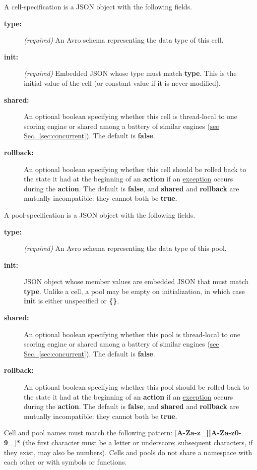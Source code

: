 \documentclass{article}
\newcommand{\PFAc}{\ttfamily\bfseries}
\newenvironment{allowedfields}%
  {\begin{center} \begin{minipage}{0.9\linewidth} \begin{description}}%
  {\end{description} \end{minipage} \end{center}}
\theoremstyle{definition}
\begin{document}
A cell-specification is a JSON object with the following fields.
\begin{allowedfields}
\item[\PFAc type:] {\it (required)} An Avro schema representing the data type of this cell.
\item[\PFAc init:] {\it (required)} Embedded JSON whose type must match {\PFAc type}.  This is the initial value of the cell (or constant value if it is never modified).
\item[\PFAc shared:] An optional boolean specifying whether this cell is thread-local to one scoring engine or shared among a battery of similar engines (\hyperlink{hsec:concurrent}{see Sec.~\ref{sec:concurrent}}).  The default is {\PFAc false}.
\item[\PFAc rollback:] An optional boolean specifying whether this cell should be rolled back to the state it had at the beginning of an {\PFAc action} if an \hyperlink{hsec:exceptions}{exception} occurs during the {\PFAc action}.  The default is {\PFAc false}, and {\PFAc shared} and {\PFAc rollback} are mutually incompatible: they cannot both be {\PFAc true}.
\end{allowedfields}

A pool-specification is a JSON object with the following fields.
\begin{allowedfields}
\item[\PFAc type:] {\it (required)} An Avro schema representing the data type of this pool.
\item[\PFAc init:] JSON object whose member values are embedded JSON that must match {\PFAc type}.  Unlike a cell, a pool may be empty on initialization, in which case {\PFAc init} is either unspecified or {\PFAc \{\}}.
\item[\PFAc shared:] An optional boolean specifying whether this pool is thread-local to one scoring engine or shared among a battery of similar engines (\hyperlink{hsec:concurrent}{see Sec.~\ref{sec:concurrent}}).  The default is {\PFAc false}.
\item[\PFAc rollback:] An optional boolean specifying whether this pool should be rolled back to the state it had at the beginning of an {\PFAc action} if an \hyperlink{hsec:exceptions}{exception} occurs during the {\PFAc action}.  The default is {\PFAc false}, and {\PFAc shared} and {\PFAc rollback} are mutually incompatible: they cannot both be {\PFAc true}.
\end{allowedfields}

Cell and pool names must match the following pattern: {\PFAc [A-Za-z\_][A-Za-z0-9\_]*} (the first character must be a letter or underscore; subsequent characters, if they exist, may also be numbers).  Cells and pools do not share a namespace with each other or with symbols or functions.
\end{document}
